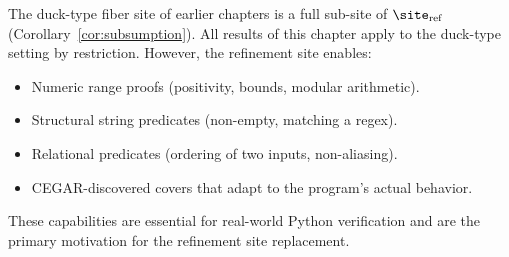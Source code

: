 \begin{remark}
The duck-type fiber site of earlier chapters is a full sub-site of
$\site_{\mathrm{ref}}$ (Corollary~\ref{cor:subsumption}).  All results
of this chapter apply to the duck-type setting by restriction.
However, the refinement site enables:
\begin{itemize}
\item Numeric range proofs (positivity, bounds, modular arithmetic).
\item Structural string predicates (non-empty, matching a regex).
\item Relational predicates (ordering of two inputs, non-aliasing).
\item CEGAR-discovered covers that adapt to the program's actual behavior.
\end{itemize}
These capabilities are essential for real-world Python verification and
are the primary motivation for the refinement site replacement.
\end{remark}
